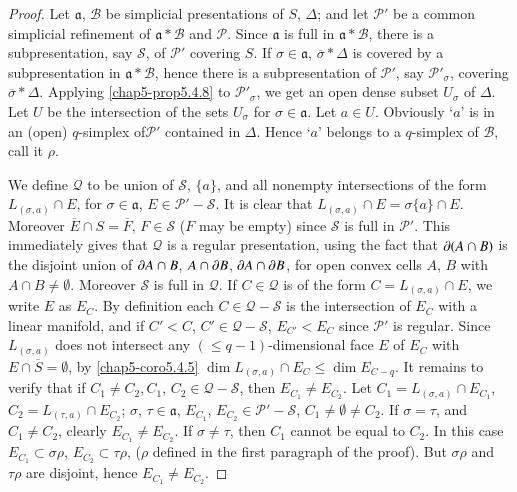 \begin{proof}
Let $\mathfrak{a}$, $\mathscr{B}$ be simplicial presentations of $S$, $\Delta$; and let $\mathscr{P}'$ be a common simplicial refinement of $\mathfrak{a}\ast\mathscr{B}$ and $\mathscr{P}$. Since $\mathfrak{a}$ is full in $\mathfrak{a}\ast \mathscr{B}$, there is a subpresentation, say $\mathscr{S}$, of $\mathscr{P}'$ covering $S$. If $\sigma\in \mathfrak{a}$, $\overline{\sigma}\ast\Delta$ is covered by a subpresentation in $\mathfrak{a}\ast\mathscr{B}$, hence there is a subpresentation of $\mathscr{P}'$, say $\mathscr{P}'_{\sigma}$, covering $\overline{\sigma}\ast\Delta$. Applying \ref{chap5-prop5.4.8} to $\mathscr{P}'_{\sigma}$, we get an open dense subset $U_{\sigma}$ of $\Delta$. Let $U$ be the intersection of the sets $U_{\sigma}$ for $\sigma\in \mathfrak{a}$. Let $a\in U$. Obviously `$a$' is in an (open) $q$-simplex of\pageoriginale $\mathscr{P}'$ contained in $\Delta$. Hence `$a$' belongs to a $q$-simplex of $\mathscr{B}$, call it $\rho$.

We define $\mathcal{Q}$ to be union of $\mathscr{S}$, $\{a\}$, and all nonempty intersections of the form $L_{(\sigma,a)}\cap E$, for $\sigma\in \mathfrak{a}$, $E\in \mathscr{P}'-\mathscr{S}$. It is clear that $L_{(\sigma,a)}\cap E=\sigma\{a\}\cap E$. Moreover $\overline{E}\cap S=\overline{F}$, $F\in\mathscr{S}$ ($F$ may be empty) since $\mathscr{S}$ is full in $\mathscr{P}'$. This immediately gives that $\mathcal{Q}$ is a regular presentation, using the fact that $\partial (A\cap B)$ is the disjoint union of $\partial A\cap B$, $A\cap \partial B$, $\partial A\cap \partial B$, for open convex cells $A$, $B$ with $A\cap B\neq \emptyset$. Moreover $\mathscr{S}$ is full in $\mathcal{Q}$. If $C\in \mathcal{Q}$ is of the form $C=L_{(\sigma,a)}\cap E$, we write $E$ as $E_{C}$. By definition each $C\in \mathcal{Q}-\mathscr{S}$ is the intersection of $E_{C}$ with a linear manifold, and if $C'<C$, $C'\in\mathcal{Q}-\mathscr{S}$, $E_{C'}<E_{C}$ since $\mathscr{P}'$ is regular. Since $L_{(\sigma,a)}$ does not intersect any $(\leq q-1)$-dimensional face $E$ of $E_{C}$ with $E\cap \overline{S}=\emptyset$, by \ref{chap5-coro5.4.5} $\dim L_{(\sigma,a)}\cap E_{C}\leq \dim E_{C-q}$. It remains to verify that if $C_{1}\neq C_{2}, C_{1}$, $C_{2}\in \mathcal{Q}-\mathscr{S}$, then $E_{C_{1}}\neq E_{C_{2}}$. Let $C_{1}=L_{(\sigma,a)}\cap E_{C_{1}}$, $C_{2}=L_{(\tau,a)}\cap E_{C_{2}}$; $\sigma$, $\tau\in \mathfrak{a}$, $E_{C_{1}}$, $E_{C_{2}}\in\mathscr{P}'-\mathscr{S}$, $C_{1}\neq \emptyset \neq C_{2}$. If $\sigma=\tau$, and $C_{1}\neq C_{2}$, clearly $E_{C_{1}}\neq E_{C_{2}}$. If $\sigma\neq \tau$, then $C_{1}$ cannot be equal to $C_{2}$. In this case $E_{C_{1}}\subset \sigma\rho$, $E_{C_{2}}\subset \tau \rho$, ($\rho$ defined in the first paragraph of the proof). But $\sigma\rho$ and $\tau\rho$ are disjoint, hence $E_{C_{1}}\neq E_{C_{2}}$.
\end{proof}

